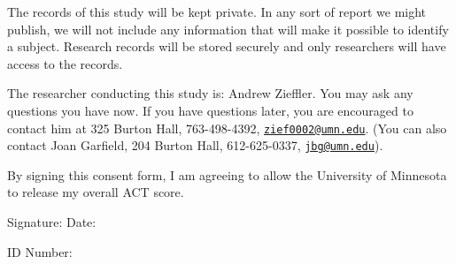 \documentclass[11pt]{umnthesis}
\begin{document}
\noindent The records of this study will be kept private. In any sort of report we might publish, we will not include any information that will make it possible to identify a subject. Research records will be stored securely and only researchers will have access to the records.

\noindent The researcher conducting this study is: Andrew Zieffler. You may ask any questions you have now. If you have questions later, you are encouraged to contact him at 325 Burton Hall, 763-498-4392, \href{mailto:zief0002@umn.edu}{\nolinkurl{zief0002@umn.edu}}. (You can also contact Joan Garfield, 204 Burton Hall, 612-625-0337, \href{mailto:jbg@umn.edu}{\nolinkurl{jbg@umn.edu}}).

\noindent By signing this consent form, I am agreeing to allow the University of Minnesota to release my overall ACT score.

\noindent Signature: \underline{\hspace{3in}} Date: \underline{\hspace{1in}}

\noindent ID Number: \underline{\hspace{3in}}
\end{document}
